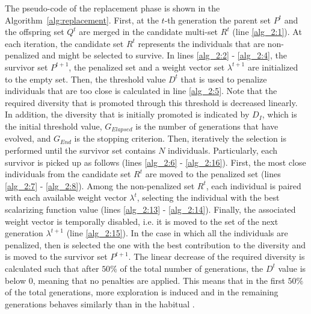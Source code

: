%
The pseudo-code of the replacement phase is shown in the Algorithm~\ref{alg:replacement}.
%
First, at the $t$-th generation the parent set $P^t$ and the offspring set $Q^t$ are merged in the candidate multi-set $R^t$ (line \ref{alg_2:1}).
%
At each iteration, the candidate set $R^t$ represents the individuals that are non-penalized and might be selected to survive.
%
In lines \ref{alg_2:2} - \ref{alg_2:4}, the survivor set $P^{t+1}$, the penalized set and a weight vector set $\lambda^{t+1}$ are initialized to the empty set.
%
Then, the threshold value $D^t$ that is used to penalize individuals that are too close is calculated in line \ref{alg_2:5}.
%
Note that the required diversity that is promoted through this threshold is decreased linearly.
%
In addition, the diversity that is initially promoted is indicated by $D_I$, which is the initial threshold value, $G_{Elapsed}$ is the number of generations that have evolved, and $G_{End}$ is the stopping criterion.
%
Then, iteratively the selection is performed until the survivor set contains $N$ individuals.
%
Particularly, each survivor is picked up as follows (lines \ref{alg_2:6} - \ref{alg_2:16}).
%
First, the most close individuals from the candidate set $R^t$ are moved to the penalized set (lines \ref{alg_2:7} - \ref{alg_2:8}).
%
Among the non-penalized set $R^t$, each individual is paired with each available weight vector $\lambda^t$, selecting the individual with the best scalarizing function value (lines \ref{alg_2:13} - \ref{alg_2:14}).
%
Finally, the associated weight vector is temporally disabled, i.e. it is moved to the set of the next generation $\lambda^{t+1}$ (line \ref{alg_2:15}).
%
In the case in which all the individuals are penalized, then is selected the one with the best contribution to the diversity and is moved to the survivor set $P^{t+1}$.
%
The linear decrease of the required diversity is calculated such that after $50\%$ of the total number of generations, the $D^t$ value is below 0, meaning that no penalties are applied.
%
This means that in the first $50\%$ of the total generations, more exploration is induced and in the remaining generations \VSDMOEAD{} behaves similarly than in the habitual \MOEAS{}.
%



